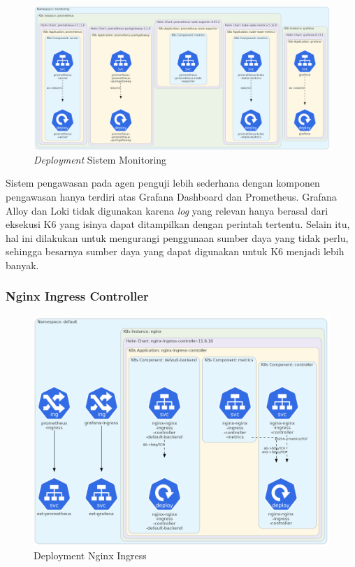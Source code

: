 \begin{figure}[htbp]
    \centering
    \includegraphics[width=1\textwidth]{resources/chapter-4/agent-monitoring.png}
    \caption{\textit{Deployment} Sistem Monitoring}
    \label{fig:deployment-monitoring-agent}
\end{figure}

Sistem pengawasan pada agen penguji lebih sederhana dengan komponen pengawasan hanya terdiri atas Grafana Dashboard dan Prometheus. Grafana Alloy dan Loki tidak digunakan karena \textit{log} yang relevan hanya berasal dari eksekusi K6 yang isinya dapat ditampilkan dengan perintah tertentu. Selain itu, hal ini dilakukan untuk mengurangi penggunaan sumber daya yang tidak perlu, sehingga besarnya sumber daya yang dapat digunakan untuk K6 menjadi lebih banyak.

\pagebreak

\subsubsection{Nginx Ingress Controller}

\begin{figure}[htbp]
    \centering
    \includegraphics[width=1\textwidth]{resources/chapter-4/agent-nginx-1.png}
    \caption{Deployment Nginx Ingress}
    \label{fig:deployment-nginx-agent-1}
\end{figure}

